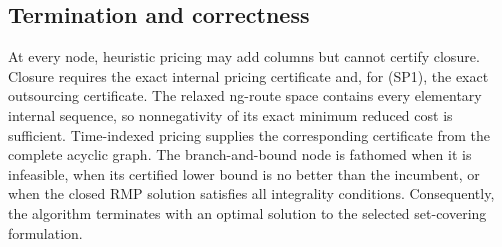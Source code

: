 \subsection{Termination and correctness}

At every node, heuristic pricing may add columns but cannot certify closure.
Closure requires the exact internal pricing certificate and, for \textup{(SP1)},
the exact outsourcing certificate. The relaxed ng-route
space contains every elementary internal sequence, so nonnegativity of its exact
minimum reduced cost is sufficient. Time-indexed pricing supplies the corresponding
certificate from the complete acyclic graph. The branch-and-bound node is fathomed
when it is infeasible, when its certified lower bound is no better than the
incumbent, or when the closed RMP solution satisfies all integrality conditions.
Consequently, the algorithm terminates with an optimal solution to the selected
set-covering formulation.
